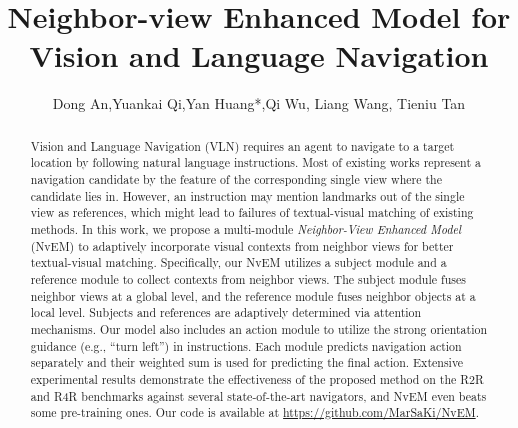 \documentclass[sigconf]{acmart}
\begin{document}
\fancyhead{}

\title{Neighbor-view Enhanced Model for Vision and Language Navigation}



\author{Dong An,\quad Yuankai Qi,\quad Yan Huang*,\quad Qi Wu, \quad Liang Wang, \quad Tieniu Tan}


\makeatletter
\def\authornotetext#1{
	\if@ACM@anonymous\else
	\g@addto@macro\@authornotes{
		\stepcounter{footnote}\footnotetext{#1}}
	\fi}
\makeatother
\authornotetext{Corresponding author.}




\def\authors{Dong An, Yuankai Qi, Yan Huang, Qi Wu, Liang Wang, Tieniu Tan}


\renewcommand{\shortauthors}{An and Qi et al.}



\begin{abstract}
 	Vision and Language Navigation (VLN) requires an agent to navigate to a target location by following natural language instructions. Most of existing works represent a navigation candidate by the feature of the corresponding single view where the candidate lies in. However, an instruction may mention landmarks out of the single view as references, which might lead to failures of textual-visual matching of existing methods. In this work, we propose a multi-module \textit{Neighbor-View Enhanced Model} (NvEM) to adaptively incorporate visual contexts from neighbor views for better textual-visual matching. Specifically, our NvEM utilizes a subject module and a reference module to collect contexts from neighbor views. The subject module fuses neighbor views at a global level, and the reference module fuses neighbor objects at a local level. Subjects and references are adaptively determined via attention mechanisms. Our model also includes an action module to utilize the strong orientation guidance (e.g., ``turn left'') in instructions. Each module predicts navigation action separately and their weighted sum is used for predicting the final action. Extensive experimental results demonstrate the effectiveness of the proposed method on the R2R and R4R benchmarks against several state-of-the-art navigators, and NvEM even beats some pre-training ones. Our code is available at \url{https://github.com/MarSaKi/NvEM}.
\end{abstract}
\end{document}
